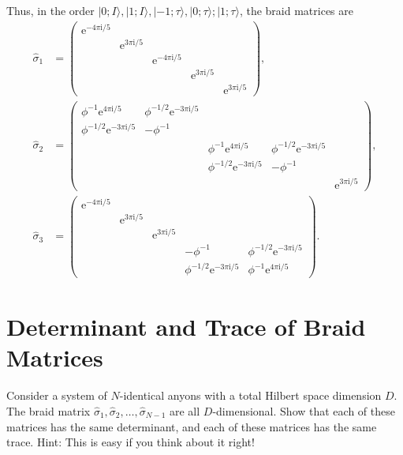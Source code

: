 \documentclass{book}
\begin{document}
Thus, in the order $|0;I \rangle ,|1;I \rangle ,|-1;\tau \rangle ,|0;\tau \rangle ;|1;\tau \rangle $, the braid matrices are
\begin{align*}
\hat{\sigma }_{1} & =\begin{pmatrix}
\mathrm{e}^{-4\pi \mathrm{i} /5} &  &  &  & \\
 & \mathrm{e}^{3\pi \mathrm{i} /5} &  &  & \\
 &  & \mathrm{e}^{-4\pi \mathrm{i} /5} &  & \\
 &  &  & \mathrm{e}^{3\pi \mathrm{i} /5} & \\
 &  &  &  & \mathrm{e}^{3\pi \mathrm{i} /5}
\end{pmatrix} ,\\
\hat{\sigma }_{2} & =\begin{pmatrix}
\phi ^{-1}\mathrm{e}^{4\pi \mathrm{i} /5} & \phi ^{-1/2}\mathrm{e}^{-3\pi \mathrm{i} /5} &  &  & \\
\phi ^{-1/2}\mathrm{e}^{-3\pi \mathrm{i} /5} & -\phi ^{-1} &  &  & \\
 &  & \phi ^{-1}\mathrm{e}^{4\pi \mathrm{i} /5} & \phi ^{-1/2}\mathrm{e}^{-3\pi \mathrm{i} /5} & \\
 &  & \phi ^{-1/2}\mathrm{e}^{-3\pi \mathrm{i} /5} & -\phi ^{-1} & \\
 &  &  &  & \mathrm{e}^{3\pi \mathrm{i} /5}
\end{pmatrix} ,\\
\hat{\sigma }_{3} & =\begin{pmatrix}
\mathrm{e}^{-4\pi \mathrm{i} /5} &  &  &  & \\
 & \mathrm{e}^{3\pi \mathrm{i} /5} &  &  & \\
 &  & \mathrm{e}^{3\pi \mathrm{i} /5} &  & \\
 &  &  & -\phi ^{-1} & \phi ^{-1/2}\mathrm{e}^{-3\pi \mathrm{i} /5}\\
 &  &  & \phi ^{-1/2}\mathrm{e}^{-3\pi \mathrm{i} /5} & \phi ^{-1}\mathrm{e}^{4\pi \mathrm{i} /5}
\end{pmatrix} .
\end{align*}
\section{Determinant and Trace of Braid Matrices}
Consider a system of $N$-identical anyons with a total Hilbert space dimension $D$. The braid matrix $\hat{\sigma }_{1} ,\hat{\sigma }_{2} ,\dotsc ,\hat{\sigma }_{N-1}$ are all $D$-dimensional. Show that each of these matrices has the same determinant, and each of these matrices has the same trace. Hint: This is easy if you think about it right!
\end{document}

